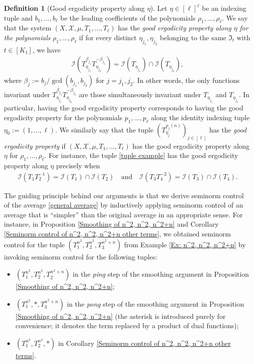 \documentclass[11pt]{amsart}
\theoremstyle{definition}
\newtheorem*{definition}{Definition}
\newcommand{\CI}{{\mathcal I}}
\newcommand{\CX}{{\mathcal X}}
\newcommand{\FI}{{\mathfrak I}}
\newcommand{\inv}{^{-1}}
\begin{document}
\begin{definition}[Good ergodicity property along $\eta$] Let $\eta\in[\ell]^\ell$ be an indexing tuple and $b_1, \ldots, b_\ell$ be the leading coefficients of the polynomials $\rho_1, \ldots, \rho_\ell$. We say that  the system  $(X,\CX, \mu,T_1, \ldots, T_\ell)$ has the \emph{good ergodicity property along $\eta$ for the polynomials} $\rho_1, \ldots, \rho_\ell$ if for every distinct $\eta_{j_1}, \eta_{j_2}$ belonging to the same $\FI_t$ with $t\in[K_1]$,  we have
\begin{align*}
    \CI(T_{\eta_{j_1}}^{\beta_{j_1}}T_{\eta_{j_2}}^{-\beta_{j_2}}) = \CI(T_{\eta_{j_1}})\cap \CI(T_{\eta_{j_2}}),
\end{align*}
where $\beta_{j} := b_{j}/\gcd(b_{j_1}, b_{j_2})$ for $j=j_1, j_2$. In other words, the only functions invariant under $T_{\eta_{j_1}}^{\beta_{j_1}}T_{\eta_{j_2}}^{-\beta_{j_2}}$ are those simultaneously invariant under $T_{\eta_{j_1}}$ and $T_{\eta_{j_2}}$.
In particular, having the good ergodicity property corresponds to having the good ergodicity property for the polynomials $p_1,\ldots, p_\ell$ along the identity indexing tuple $\eta_0 := (1, \ldots, \ell)$. We similarly say that the tuple $(T_{\eta_j}^{\rho_j(n)})_{j\in[\ell]}$ has the \emph{good ergodicity property} if $(X, \CX, \mu, T_1, \ldots, T_\ell)$ has the good ergodicity property along $\eta$ for $\rho_1, \ldots, \rho_\ell$. For instance, the tuple \eqref{tuple example} has the good ergodicity property along $\eta$ precisely when
\begin{align*}
    \CI(T_1 T_2\inv) = \CI(T_1)\cap\CI(T_2)\quad \textrm{and}\quad \CI(T_3 T_4^{-2}) = \CI(T_3)\cap \CI(T_4).
\end{align*}
\end{definition}

The guiding principle behind our arguments is that we derive seminorm control of the average \eqref{general average} by inductively applying seminorm control of an average that is ``simpler'' than the original average in an appropriate sense. For instance, in Proposition \ref{Smoothing of n^2, n^2, n^2+n} and Corollary \ref{Seminorm control of n^2, n^2, n^2+n other terms}, we obtained seminorm control for the tuple $(T_1^{n^2}, T_2^{n^2}, T_3^{n^2+n})$ from Example \ref{Ex: n^2, n^2, n^2+n} by invoking seminorm control for the following tuples:
\begin{itemize}
    \item $(T_1^{n^2}, T_2^{n^2}, T_2^{n^2+n})$ in the \textit{ping} step of the smoothing argument in Proposition \ref{Smoothing of n^2, n^2, n^2+n};
    \item $(T_1^{n^2}, *, T_3^{n^2+n})$ in the \textit{pong} step of the smoothing argument in Proposition \ref{Smoothing of n^2, n^2, n^2+n} (the asterisk is introduced purely for convenience; it denotes the term replaced by a product of dual functions);
    \item $(T_1^{n^2}, T_2^{n^2}, *)$ in Corollary \ref{Seminorm control of n^2, n^2, n^2+n other terms}.
\end{itemize}
\end{document}
